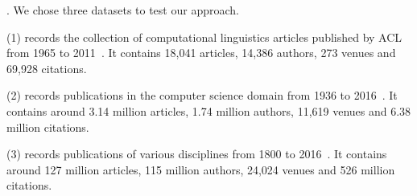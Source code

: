 
. We chose three datasets to test our approach.

\noindent
(1) \aan records the collection of computational linguistics articles published by ACL from 1965 to 2011~\cite{Liang16AAAI}.
It contains 18,041 articles, 14,386 authors, 273 venues and 69,928 citations.

\noindent
(2) \aminer records publications in the computer science domain from 1936 to 2016~\cite{Tang:08KDD}.
It contains around 3.14 million articles, 1.74 million authors, 11,619 venues and 6.38 million citations.

\noindent
(3) \magdata records publications of various disciplines from 1800 to 2016~\cite{Sinha15:MAG}.
It contains around 127 million articles, 115 million authors, 24,024 venues and 526 million citations.


